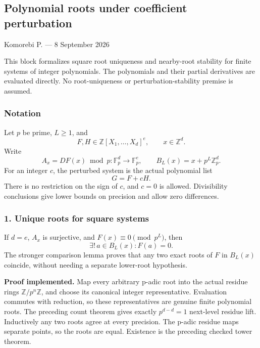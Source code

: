 \hypertarget{cont4:polynomial-roots-under-coefficient-perturbation}{%
\subsection{Polynomial roots under coefficient
perturbation}\label{cont4:polynomial-roots-under-coefficient-perturbation}}

Komorebi P. --- 8 September 2026

This block formalizes square root uniqueness and nearby-root stability
for finite systems of integer polynomials. The polynomials and their
partial derivatives are evaluated directly. No root-uniqueness or
perturbation-stability premise is assumed.

\hypertarget{cont4:notation}{%
\subsubsection{Notation}\label{cont4:notation}}

Let \(p\) be prime, \(L\ge1\), and \[
F,H\in\mathbb Z[X_1,\ldots,X_d]^e,
\qquad x\in\mathbb Z^d.
\] Write \[
A_x=DF(x)\bmod p:\mathbb F_p^d\longrightarrow\mathbb F_p^e,
\qquad B_L(x)=x+p^L\mathbb Z_p^d.
\] For an integer \(c\), the perturbed system is the actual polynomial
list \[
G=F+cH.
\] There is no restriction on the sign of \(c\), and \(c=0\) is allowed.
Divisibility conclusions give lower bounds on precision and allow zero
differences.

\hypertarget{cont4:unique-roots-for-square-systems}{%
\subsubsection{1. Unique roots for square
systems}\label{cont4:unique-roots-for-square-systems}}

If \(d=e\), \(A_x\) is surjective, and \(F(x)\equiv0\pmod{p^L}\), then
\[
\boxed{\exists!\,a\in B_L(x):F(a)=0.}
\] The stronger comparison lemma proves that any two exact roots of
\(F\) in \(B_L(x)\) coincide, without needing a separate lower-root
hypothesis.

\textbf{Proof implemented.} Map every arbitrary p-adic root into the
actual residue rings \(\mathbb Z/p^n\mathbb Z\), and choose its
canonical integer representative. Evaluation commutes with reduction, so
these representatives are genuine finite polynomial roots. The preceding
count theorem gives exactly \(p^{d-d}=1\) next-level residue lift.
Inductively any two roots agree at every precision. The p-adic residue
maps separate points, so the roots are equal. Existence is the preceding
checked tower theorem.

